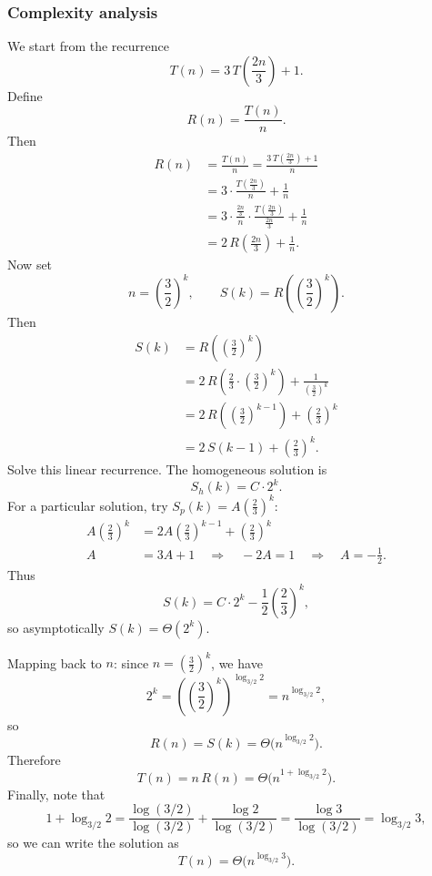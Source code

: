 \documentclass[9pt]{extarticle}
\begin{document}
\subsubsection*{Complexity analysis}
We start from the recurrence
\[
T(n) = 3\,T\!\left(\frac{2n}{3}\right) + 1.
\]
Define
\[
R(n) = \frac{T(n)}{n}.
\]
Then
\begin{align*}
R(n)
&= \frac{T(n)}{n}
 = \frac{3\,T\!\left(\frac{2n}{3}\right) + 1}{n}                                   \\
&= 3 \cdot \frac{T\!\left(\frac{2n}{3}\right)}{n} + \frac{1}{n}                     \\
&= 3 \cdot \frac{\frac{2n}{3}}{n} \cdot \frac{T\!\left(\frac{2n}{3}\right)}{\frac{2n}{3}}
   + \frac{1}{n}                                                                    \\
&= 2\,R\!\left(\frac{2n}{3}\right) + \frac{1}{n}.
\end{align*}
Now set
\[
n = \left(\frac{3}{2}\right)^k, \qquad S(k) = R\!\left(\left(\frac{3}{2}\right)^k\right).
\]
Then
\begin{align*}
S(k)
&= R\!\left(\left(\frac{3}{2}\right)^k\right)                                      \\
&= 2\,R\!\left(\frac{2}{3} \cdot \left(\frac{3}{2}\right)^k\right) + 
    \frac{1}{\left(\frac{3}{2}\right)^k}                                           \\
&= 2\,R\!\left(\left(\frac{3}{2}\right)^{k-1}\right) + \left(\frac{2}{3}\right)^k \\
&= 2\,S(k-1) + \left(\frac{2}{3}\right)^k.
\end{align*}
Solve this linear recurrence. The homogeneous solution is
\[
S_h(k) = C \cdot 2^k.
\]
For a particular solution, try \(S_p(k) = A\left(\frac{2}{3}\right)^k\):
\begin{align*}
A\left(\frac{2}{3}\right)^k
&= 2A\left(\frac{2}{3}\right)^{k-1} + \left(\frac{2}{3}\right)^k                  \\
A
&= 3A + 1 \quad\Rightarrow\quad -2A = 1 \quad\Rightarrow\quad A = -\frac{1}{2}.
\end{align*}
Thus
\[
S(k) = C \cdot 2^k - \frac{1}{2}\left(\frac{2}{3}\right)^k,
\]
so asymptotically \(S(k) = \Theta(2^k)\).

Mapping back to \(n\): since \(n = \left(\frac{3}{2}\right)^k\), we have
\[
2^k = \left(\left(\frac{3}{2}\right)^k\right)^{\log_{3/2} 2} = n^{\log_{3/2} 2},
\]
so
\[
R(n) = S(k) = \Theta\!\bigl(n^{\log_{3/2} 2}\bigr).
\]
Therefore
\[
T(n) = n\,R(n) = \Theta\!\bigl(n^{1 + \log_{3/2} 2}\bigr).
\]
Finally, note that
\[
1 + \log_{3/2} 2
= \frac{\log(3/2)}{\log(3/2)} + \frac{\log 2}{\log(3/2)}
= \frac{\log 3}{\log(3/2)}
= \log_{3/2} 3,
\]
so we can write the solution as
\[
\boxed{T(n) = \Theta\!\bigl(n^{\log_{3/2} 3}\bigr)}.
\]
\end{document}
